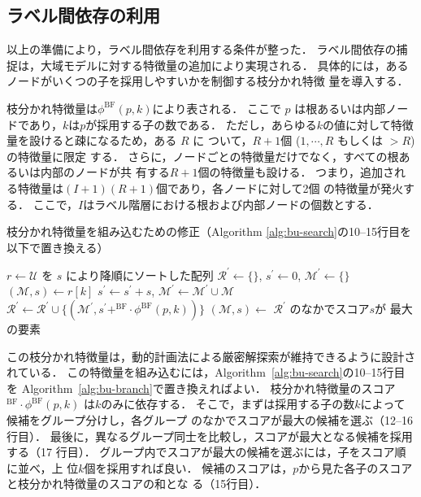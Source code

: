 \documentclass[japanese]{jnlp_1.4}
\newcommand{\vect}[1]{}
\begin{document}
\subsection{ラベル間依存の利用}
\label{sec:proposed-branch}

以上の準備により，ラベル間依存を利用する条件が整った．
ラベル間依存の捕捉は，大域モデルに対する特徴量の追加により実現される．
具体的には，あるノードがいくつの子を採用しやすいかを制御する枝分かれ特徴
量を導入する．

枝分かれ特徴量は$\phi^{\mathrm{BF}}(p, k)$により表される．
ここで $p$ は根あるいは内部ノードであり，$k$は$p$が採用する子の数である．
ただし，あらゆる$k$の値に対して特徴量を設けると疎になるため，ある $R$ に
ついて，$R + 1$個 ($1, \cdots, R$ もしくは $>R$) の特徴量に限定
する．
さらに，ノードごとの特徴量だけでなく，すべての根あるいは内部のノードが共
有する$R + 1$個の特徴量も設ける．
つまり，追加される特徴量は$(I + 1) (R + 1)$個であり，各ノードに対して2個
の特徴量が発火する．
ここで，$I$はラベル階層における根および内部ノードの個数とする．


\begin{algorithm}[t]
\caption{
枝分かれ特徴量を組み込むための修正（Algorithm \ref{alg:bu-search}の10--15行目を以下で置き換える）}
\label{alg:bu-branch}
\DeclarePairedDelimiter\norm{\lVert}{\rVert}
\renewcommand{\algorithmicrequire}{}
\renewcommand{\algorithmicensure}{}
\setlength{\baselineskip}{11pt}
\begin{algorithmic}[1] \setcounter{ALC@line}{9}
\STATE $r \leftarrow \mathcal{U}$ を $s$ により降順にソートした配列
\STATE $ \mathcal{R}^\prime \leftarrow \{\} $, \quad $s^\prime \leftarrow 0$, \quad $\mathcal{M}^\prime \leftarrow \{\}$
  \STATE $(\mathcal{M}, s) \leftarrow r[k]$
  \STATE $s^\prime \leftarrow s^\prime + s$, \quad $\mathcal{M}^\prime \leftarrow \mathcal{M}^\prime \cup \mathcal{M}$
  \STATE $\mathcal{R}^\prime \leftarrow \mathcal{R}^\prime \cup \{(\mathcal{M}^\prime, s^\prime +
 \vect{w}^{\mathrm{BF}} \cdot \phi^{\mathrm{BF}}(p, k)) \}$
\ENDFOR
\STATE $(\mathcal{M}, s) \leftarrow $ $\mathcal{R}^\prime$ のなかでスコア$s$が
 最大の要素
\end{algorithmic}
\end{algorithm}


この枝分かれ特徴量は，動的計画法による厳密解探索が維持できるように設計さ
れている．
この特徴量を組み込むには，Algorithm~\ref{alg:bu-search}の10--15行目を
Algorithm~\ref{alg:bu-branch}で置き換えればよい．
枝分かれ特徴量のスコア
$\vect{w}^{\mathrm{BF}} \cdot \phi^{\mathrm{BF}}(p, k)$
は$k$のみに依存する．
そこで，まずは採用する子の数$k$によって候補をグループ分けし，各グループ
のなかでスコアが最大の候補を選ぶ（12--16行目）．
最後に，異なるグループ同士を比較し，スコアが最大となる候補を採用する（17
行目）．
グループ内でスコアが最大の候補を選ぶには，子をスコア順に並べ，上
位$k$個を採用すれば良い．
候補のスコアは，$p$から見た各子のスコアと枝分かれ特徴量のスコアの和とな
る（15行目）．
\end{document}
